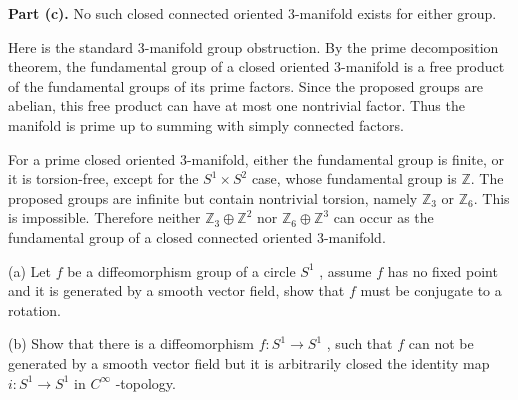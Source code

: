 \begin{solution}
\textbf{Part (c).}
No such closed connected oriented 3-manifold exists for either group.

Here is the standard 3-manifold group obstruction. By the prime decomposition
theorem, the fundamental group of a closed oriented 3-manifold is a free product
of the fundamental groups of its prime factors. Since the proposed groups are
abelian, this free product can have at most one nontrivial factor. Thus the
manifold is prime up to summing with simply connected factors.

For a prime closed oriented 3-manifold, either the fundamental group is finite,
or it is torsion-free, except for the $S^1\times S^2$ case, whose fundamental
group is $\mathbb{Z}$. The proposed groups are infinite but contain nontrivial
torsion, namely $\mathbb{Z}_3$ or $\mathbb{Z}_6$. This is impossible. Therefore
neither $\mathbb{Z}_3\oplus\mathbb{Z}^2$ nor
$\mathbb{Z}_6\oplus\mathbb{Z}^3$ can occur as the fundamental group of a closed
connected oriented 3-manifold.
\end{solution}

\begin{exercise}
\label{geometry:2023:3}
(a) Let $f$ be a diffeomorphism group of a circle $S ^ { 1 }$ , assume $f$ has no fixed point and it is generated by a smooth vector field, show that $f$ must be conjugate to a rotation.

(b) Show that there is a diffeomorphism $f : S ^ { 1 } \to S ^ { 1 }$ , such that $f$ can not be generated by a smooth vector field but it is arbitrarily closed the identity map $i : S ^ { 1 } \to S ^ { 1 }$ in $C ^ { \infty }$ -topology.
\end{exercise}

